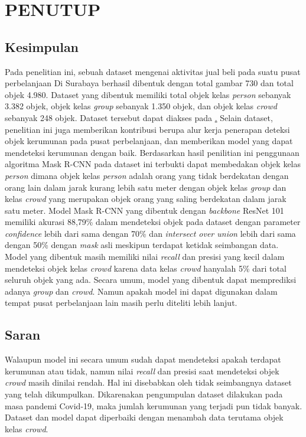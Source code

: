 \chapter{PENUTUP}
\label{sec:chap5_tutup}
\vspace{1ex}
\section*{}

\section{Kesimpulan}
\label{sec:sec4_kesimpulan}
\vspace{1ex}
Pada penelitian ini, sebuah dataset mengenai aktivitas jual beli pada suatu pusat perbelanjaan Di
Surabaya berhasil dibentuk dengan total gambar 730 dan total objek 4.980.
Dataset yang dibentuk memiliki total objek kelas \textit{person} sebanyak 3.382 objek,
objek kelas \textit{group} sebanyak 1.350 objek, dan objek kelas \textit{crowd} sebanyak 248 objek.
Dataset tersebut dapat diakses pada \href{https://www.kaggle.com/datasets/lukaspurbaw/indonesia-pasar-atom-crowd-dataset}. 
Selain dataset, penelitian ini juga memberikan kontribusi berupa alur kerja penerapan deteksi objek
kerumunan pada pusat perbelanjaan, dan memberikan model yang dapat mendeteksi kerumunan dengan baik.
Berdasarkan hasil penilitian ini penggunaan algoritma Mask R-CNN pada dataset ini terbukti dapat 
membedakan objek kelas \textit{person} dimana objek kelas \textit{person} adalah orang yang tidak berdekatan dengan orang lain
dalam jarak kurang lebih satu meter dengan objek kelas \textit{group} dan kelas \textit{crowd} yang
merupakan objek orang yang saling berdekatan dalam jarak satu meter.  Model Mask R-CNN yang dibentuk
dengan \textit{backbone} ResNet 101 memiliki akurasi 88,79\% dalam mendeteksi objek pada dataset dengan
parameter \textit{confidence} lebih dari sama dengan 70\% dan \textit{intersect over union}
lebih dari sama dengan 50\% dengan \textit{mask} asli meskipun terdapat ketidak seimbangan data. Model yang dibentuk masih memiliki nilai \textit{recall}
dan presisi yang kecil dalam mendeteksi objek kelas \textit{crowd} karena data kelas \textit{crowd}
hanyalah 5\% dari total seluruh objek yang ada. Secara umum, model yang dibentuk dapat memprediksi 
adanya \textit{group} dan \textit{crowd}. Namun apakah model ini dapat digunakan dalam tempat
pusat perbelanjaan lain masih perlu diteliti lebih lanjut.

\section{Saran}
\label{sec:sec4_saran}
\vspace{1ex}
Walaupun model ini secara umum sudah dapat mendeteksi apakah terdapat kerumunan atau tidak, namun
nilai \textit{recall} dan presisi saat mendeteksi objek \textit{crowd} masih dinilai rendah. Hal ini
disebabkan oleh tidak seimbangnya dataset yang telah dikumpulkan. Dikarenakan pengumpulan dataset
dilakukan pada masa pandemi Covid-19, maka jumlah kerumunan yang terjadi pun tidak banyak. Dataset
dan model dapat diperbaiki dengan menambah data terutama objek kelas \textit{crowd}.

